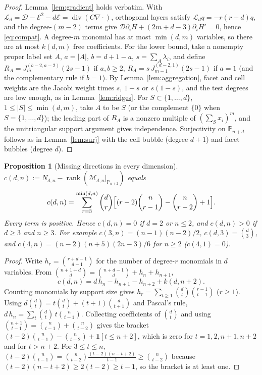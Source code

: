 \documentclass[11pt,a4paper]{article}
\newtheorem{proposition}[theorem]{Proposition}
\theoremstyle{definition}
\theoremstyle{remark}
\newcommand{\M}{\mathcal M}
\newcommand{\Pol}{\mathbb P}
\newcommand{\J}{J}
\begin{document}
\begin{proof}
Lemma~\ref{lem:gradient} holds verbatim. With
\(\mathcal L_d=\mathcal D-\mathcal E^2-d\mathcal E=\operatorname{div}(C\nabla\cdot)\),
orthogonal layers satisfy \(\mathcal L_dq=-r(r+d)q\), and the degree-\((m-2)\)
terms give \(\mathcal D\partial_iH+(2m+d-3)\partial_iH'=0\), hence
\eqref{eq:compat}. A degree-\(m\) monomial has at most \(\min(d,m)\) variables,
so there are at most \(k(d,m)\) free coefficients. For the lower bound, take a
nonempty proper label set \(A\), \(a=|A|\), \(b=d+1-a\), \(s=\sum_{A}\lambda_i\),
and define \(R_A=\J_m^{(b-2,a-2)}(2s-1)\) if \(a,b\ge2\), \(R_A=s\,
\J_{m-1}^{(d-2,1)}(2s-1)\) if \(a=1\) (and the complementary rule if \(b=1\)).
By Lemma~\ref{lem:aggregation}, facet and cell weights are the Jacobi weight
times \(s\), \(1-s\) or \(s(1-s)\), and the test degrees are low enough, as in
Lemma~\ref{lem:ridges}. For \(S\subset\{1,\dots,d\}\), \(1\le|S|\le\min(d,m)\),
take \(A\) to be \(S\) (or the complement \(\{0\}\) when \(S=\{1,\dots,d\}\));
the leading part of \(R_A\) is a nonzero multiple of \((\sum_Sx_i)^m\), and the
unitriangular support argument gives independence. Surjectivity on
\(\Pol_{n+d}\) follows as in Lemma~\ref{lem:surj} with the cell bubble (degree
\(d+1\)) and facet bubbles (degree \(d\)).
\end{proof}

\begin{proposition}[Missing directions in every dimension]
\label{prop:cdn}
\(c(d,n):=N_{d,n}-\operatorname{rank}(\M_{d,n}|_{\Pol_{n+2}})\) equals
\[
 c(d,n)=\sum_{r=3}^{\min(d,n)}\binom dr\Bigl[(r-2)\binom n{r-1}-\binom n{r-2}+1\Bigr].
\]
Every term is positive. Hence \(c(d,n)=0\) if \(d=2\) or \(n\le2\), and
\(c(d,n)>0\) if \(d\ge3\) and \(n\ge3\). For example \(c(3,n)=(n-1)(n-2)/2\),
\(c(d,3)=\binom d3\), and \(c(4,n)=(n-2)(n+5)(2n-3)/6\) for \(n\ge2\)
(\(c(4,1)=0\)).
\end{proposition}

\begin{proof}
Write \(h_r=\binom{r+d-1}{d-1}\) for the number of degree-\(r\) monomials in
\(d\) variables. From \(\binom{n+1+d}{d}=\binom{n+d-1}{d}+h_n+h_{n+1}\),
\[
 c(d,n)=d\,h_n-h_{n+1}-h_{n+2}+k(d,n+2).
\]
Counting monomials by support size gives \(h_r=\sum_{t\ge1}\binom dt\binom{r-1}{t-1}\)
(\(r\ge1\)). Using \(d\binom dt=t\binom dt+(t+1)\binom d{t+1}\) and Pascal's rule,
\(d\,h_n=\sum_t\binom dt\,t\binom n{t-1}\). Collecting coefficients of
\(\binom dt\) and using \(\binom{n+1}{t-1}=\binom n{t-1}+\binom n{t-2}\) gives
the bracket \((t-2)\binom n{t-1}-\binom n{t-2}+\mathbf 1[t\le n+2]\), which is
zero for \(t=1,2,n+1,n+2\) and for \(t>n+2\). For \(3\le t\le n\),
\((t-2)\binom n{t-1}=\binom n{t-2}\frac{(t-2)(n-t+2)}{t-1}\ge\binom n{t-2}\)
because \((t-2)(n-t+2)\ge2(t-2)\ge t-1\), so the bracket is at least one.
\end{proof}
\end{document}
